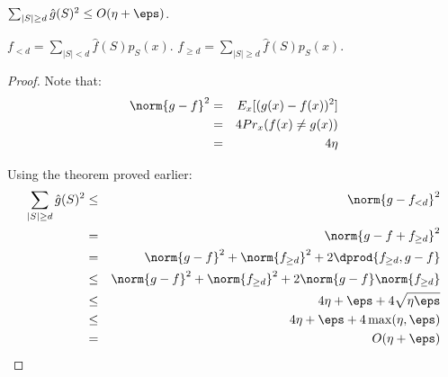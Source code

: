 \documentclass[10pt]{amsart}
\begin{document}
\begin{cor}
$\sum_{|S|\geq d} \hat{g}(S)^{2} \leq O(\eta + \eps)$.
\end{cor}
\begin{defn}
$f_{<d} = \sum_{|S|<d}\hat{f}(S)p_{S}(x)$. $f_{\geq d} = \sum_{|S| \geq d}\hat{f}(S)p_{S}(x)$.
\end{defn}
\begin{proof}

Note that:
\begin{eqnarray*}
\norm{g-f}^{2} &=& E_{x}[(g(x)-f(x))^{2}]\\
&=& 4Pr_{x}(f(x) \neq g(x))\\
&=& 4\eta \\
\end{eqnarray*}


Using the theorem proved earlier:
\begin{eqnarray*}
\sum_{|S|\geq d} \hat{g}(S)^{2} &\leq& \norm{g - f_{<d}}^{2}\\
&=& \norm{g - f + f_{\geq d}}^{2}\\
&=& \norm{g - f}^{2} + \norm{f_{\geq d}}^{2} + 2\dprod{f_{\geq d}, g-f}\\
&\leq& \norm{g - f}^{2} + \norm{f_{\geq d}}^{2} + 2\norm{g - f}\norm{f_{\geq d}}\\
&\leq& 4\eta + \eps + 4\sqrt{\eta\eps}\\
&\leq& 4\eta + \eps + 4 \max (\eta, \eps)\\
&=& O(\eta + \eps)\\
\end{eqnarray*}
\end{proof}
\end{document}
